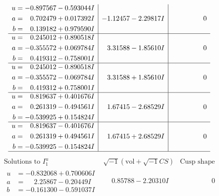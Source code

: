 \documentclass[1p]{elsarticle_modified}
\theoremstyle{definition}
\newcommand{\I}{\sqrt{-1}}
\begin{document}
$$\begin{array}{c|c|c}
\begin{aligned}
u &= -0.897567 - 0.593044 I \\
a &= \phantom{-}0.702479 + 0.017392 I \\
b &= \phantom{-}0.139182 + 0.979590 I\end{aligned}
 & -1.12457 - 2.29817 I & \phantom{-0.000000 } 0 \\ \hline\begin{aligned}
u &= \phantom{-}0.245012 + 0.890518 I \\
a &= -0.355572 + 0.069784 I \\
b &= \phantom{-}0.419312 - 0.758001 I\end{aligned}
 & \phantom{-}3.31588 - 1.85610 I & \phantom{-0.000000 } 0 \\ \hline\begin{aligned}
u &= \phantom{-}0.245012 - 0.890518 I \\
a &= -0.355572 - 0.069784 I \\
b &= \phantom{-}0.419312 + 0.758001 I\end{aligned}
 & \phantom{-}3.31588 + 1.85610 I & \phantom{-0.000000 } 0 \\ \hline\begin{aligned}
u &= \phantom{-}0.819637 + 0.401676 I \\
a &= \phantom{-}0.261319 - 0.494561 I \\
b &= -0.539925 + 0.154824 I\end{aligned}
 & \phantom{-}1.67415 - 2.68529 I & \phantom{-0.000000 } 0 \\ \hline\begin{aligned}
u &= \phantom{-}0.819637 - 0.401676 I \\
a &= \phantom{-}0.261319 + 0.494561 I \\
b &= -0.539925 - 0.154824 I\end{aligned}
 & \phantom{-}1.67415 + 2.68529 I & \phantom{-0.000000 } 0\\
 \hline 
 \end{array}$$\newpage$$\begin{array}{c|c|c}  
\text{Solutions to }I^u_{1}& \I (\text{vol} + \sqrt{-1}CS) & \text{Cusp shape}\\
 \hline 
\begin{aligned}
u &= -0.832068 + 0.700606 I \\
a &= \phantom{-}2.25867 - 0.20449 I \\
b &= -0.161300 - 0.591037 I\end{aligned}
 & \phantom{-}0.85788 - 2.20310 I & \phantom{-0.000000 } 0 \\ \hline\begin{aligned}

\end{aligned}
\end{array}$$
\end{document}
